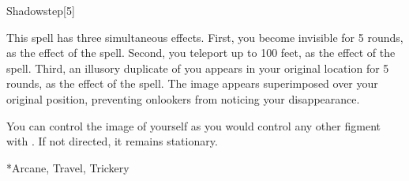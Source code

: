 \begin{spellsection}{Shadowstep}[5]
    \begin{spellheader}
    \end{spellheader}
    \begin{spellcontent}
        \begin{spelltargetinginfo}
        \end{spelltargetinginfo}
        \begin{spelleffects}
            \spelleffect This spell has three simultaneous effects.
            First, you become invisible for 5 rounds, as the effect of the  spell.
            Second, you teleport up to 100 feet, as the effect of the  spell.
            Third, an illusory duplicate of you appears in your original location for 5 rounds, as the effect of the  spell.
            The image appears superimposed over your original position, preventing onlookers from noticing your disappearance.

            You can control the image of yourself as you would control any other figment with . If not directed, it remains stationary.
        \end{spelleffects}
    \end{spellcontent}
    \begin{spellfooter}
        *{Arcane, Travel, Trickery}
        \miscastexplode
    \end{spellfooter}
    \begin{spellaugments}
    \end{spellaugments}
\end{spellsection}

